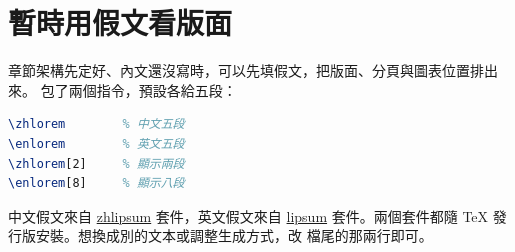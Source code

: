 \section{暫時用假文看版面}

章節架構先定好、內文還沒寫時，可以先填假文，把版面、分頁與圖表位置排出來。 包了兩個指令，預設各給五段：

\begin{lstlisting}[language=latex]
\zhlorem        % 中文五段
\enlorem        % 英文五段
\zhlorem[2]     % 顯示兩段
\enlorem[8]     % 顯示八段
\end{lstlisting}

中文假文來自 \href{https://ctan.org/pkg/zhlipsum}{zhlipsum} 套件，英文假文來自 \href{https://ctan.org/pkg/lipsum}{lipsum} 套件。兩個套件都隨 \TeX{} 發行版安裝。想換成別的文本或調整生成方式，改  檔尾的那兩行即可。
